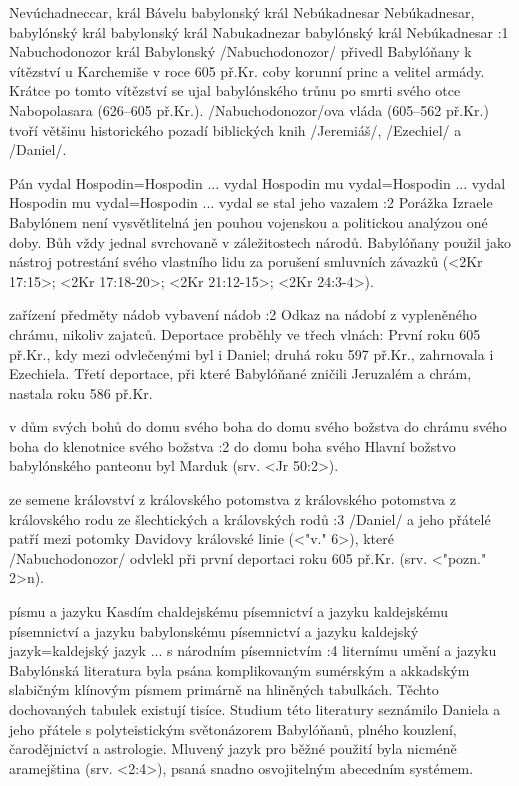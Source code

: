     {Nevúchadneccar, král Bávelu} %
    {babylonský král Nebúkadnesar}  %
    {Nebúkadnesar, babylónský král} %
    {babylonský král Nabukadnezar}  %
    {babylónský král Nebúkadnesar}  %
:1 {Nabuchodonozor král Babylonský} 
\x/Nabuchodonozor/ přivedl Babylóňany k vítězství u Karchemiše v roce 605 př.Kr. coby korunní princ a velitel armády. Krátce po tomto vítězství se ujal babylónského trůnu po smrti svého otce Nabopolasara (626--605 př.Kr.). \x/Nabuchodonozor/ova vláda (605--562 př.Kr.) tvoří většinu historického pozadí  biblických knih \x/Jeremiáš/, \x/Ezechiel/ a \x/Daniel/.     

    {Pán vydal} %
    {Hospodin}={Hospodin ... vydal}  %
    {Hospodin mu vydal}={Hospodin ... vydal} %
    {Hospodin mu vydal}={Hospodin ... vydal}  %
    {se stal jeho vazalem}  %
:2 {} Porážka Izraele Babylónem není vysvětlitelná jen pouhou vojenskou a politickou analýzou oné doby. Bůh vždy jednal svrchovaně v záležitostech národů. Babylóňany použil jako nástroj potrestání svého vlastního lidu za porušení smluvních závazků (<2Kr 17:15>; <2Kr 17:18-20>; <2Kr 21:12-15>; <2Kr 24:3-4>).

    {zařízení} %
    {předměty}  %
    {nádob} %
    {vybavení}  %
    {nádob}  %
:2 {} Odkaz na nádobí z vypleněného chrámu, nikoliv zajatců. Deportace proběhly ve třech vlnách: První roku 605 př.Kr., kdy mezi odvlečenými byl i Daniel; druhá roku 597 př.Kr., zahrnovala i Ezechiela. Třetí deportace, při které Babylóňané zničili Jeruzalém a chrám, nastala roku 586 př.Kr.

    {v dům svých bohů} %
    {do domu svého boha}  %
    {do domu svého božstva} %
    {do chrámu svého boha}  %
    {do klenotnice svého božstva}  %
:2 {do domu boha svého}  Hlavní božstvo babylónského panteonu byl Marduk  (srv. <Jr 50:2>).

    {ze semene království} %
    {z královského potomstva}  %
    {z královského potomstva} %
    {z královského rodu}  %
    {ze šlechtických a královských rodů}  %
:3 {} \x/Daniel/ a jeho přátelé patří mezi potomky Davidovy královské linie (<"v." 6>), které \x/Nabuchodonozor/ odvlekl při první deportaci roku 605 př.Kr. (srv. <"pozn." 2>n). 

    {písmu a jazyku Kasdím} %
    {chaldejskému písemnictví a jazyku}  %
    {kaldejskému písemnictví a jazyku} %
    {babylonskému písemnictví a jazyku}  %
    {kaldejský jazyk}={kaldejský jazyk ... s národním písemnictvím}  %
:4 {liternímu umění a jazyku} Babylónská literatura byla psána komplikovaným sumérským a akkadským slabičným klínovým písmem primárně na hliněných tabulkách. Těchto dochovaných tabulek existují tisíce. Studium této literatury seznámilo Daniela a jeho přátele s polyteistickým světonázorem Babylóňanů, plného kouzlení, čarodějnictví a astrologie.  Mluvený jazyk pro běžné použití byla nicméně aramejština (srv. <2:4>), psaná snadno osvojitelným abecedním systémem.

